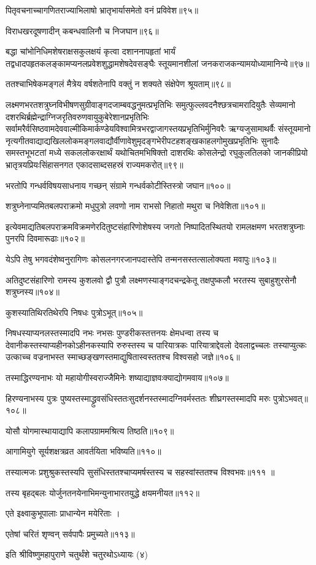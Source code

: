 पितृवचनाच्चागणितराज्याभिलाषो भ्रातृभार्यासमेतो वनं प्रविवेश॥९५॥

विराधखरदूषणादीन् कबन्धवालिनौ च निजघान॥९६॥

बद्धा चांभोनिधिमशेषराक्षसकुलक्षयं कृत्वा दशाननापहृतां भार्यं
तद्वधादपहृतकलङ्कामप्यनलप्रवेशशुद्धामशेषदेवसङ्घैः स्तूयमानशीलां जनकराजकन्यामयोध्यामानिन्ये॥९७॥

ततश्चाभिषेकमङ्गलं मैत्रेय वर्षशतेनापि वक्तुं न शक्यते संक्षेपेण श्रूयताम्॥९८॥

लक्ष्मणभरतशत्रुघ्नविभीषणसुग्रीवाङ्गदजाम्बवद्धनुमत्प्रभृतिभिः समुत्फुल्लवदनैश्छत्रचामरादियुतैः
सेव्यमानो दशरथिर्ब्रह्मेन्द्राग्निजरृतिवरुणवायुकुबेरेशानप्रभृतिभिः
सर्वामरैर्वसिष्ठवामदेववाल्मीकिमार्कण्डेयविश्वामित्रभरद्वाजागस्तयप्रभृतिभिर्मुनिवरैः
ऋग्यजुसामाथर्वैः संस्तूयमानो
नृत्यगीतवाद्याद्यखिललोकमङ्गलवाद्यौर्वीणावेशुमृदङ्गभेरीपटहशङ्खकाहलगोमुखप्रभृतिभिः सुनादैः
समस्तभूभटतां मध्ये सकललोकरक्षार्थं यथोचितमभिषिक्तो दाशरथिः कोसलेन्द्रो रघुकुलतिलको
जानकीप्रियो भ्रातृत्रयप्रियःसिंहासनगत एकादसाब्दसहस्रं राज्यमकरोत्॥९९॥

भरतोपि गन्धर्वविषयसाधनाय गच्छन् संग्रामे गन्धर्वकोटीस्तिस्त्रो जघान॥१००॥

शत्रुघ्नेनाप्यमितबलपराक्रमो मधुपुत्रो लवणो नाम राभसो निहातो मथुरा च निवेशिता॥१०१॥

इत्येवमाद्यतिबलपराक्रमविक्रमणेरदितुष्टसंहारिणोशेषस्य जगतो निष्पादितस्थितयो रामलक्षमण
भरतशत्रुघ्नाः पुनरपि दिवमारूढाः॥१०२॥

येऽपि तेषु भगवदंशेष्वनुरागिणः कोसलनगरजानपदास्तेपि तन्मनसस्तत्सालोक्यता मवापुः॥१०३॥

अतिदुष्टसंहारिणो रामस्य कुशलवो द्वौ पुत्रौ लक्ष्मणस्याङ्गदचन्द्रकेतू तक्षपुष्कलौ भरतस्य
सुबाहुशुरसेनौ शत्रुघ्नस्य॥१०४॥

कुशस्यातिथिरतिथेरपि निषधः पुत्रोऽभूत्॥१०५॥

निषधस्याप्यनलस्तस्मादपि नभः नभसः पुण्डरीकस्तत्तनयः क्षेमधन्वा तस्य च
देवानीकस्तस्याप्यहीनकोऽहीनकस्यापि रुरुस्तस्य च पारियात्रकः पारियात्राद्देवलो
देवलाद्वच्चलः तस्याप्युत्कः उत्काच्च वज्रनाभस्त स्माच्छङ्खणस्तमाद्युषितास्वस्ततश्च विश्वसहो
जज्ञे॥१०६॥

तस्माद्धिरण्यनाभः यो महायोगीस्वराज्जैमिनेः शष्याद्याज्ञवःक्याद्योगमवाय॥१०७॥

हिरण्यनाभस्य पुत्रः पुष्यस्तस्माद्ध्रुवसंधिस्ततःसुदर्शनस्तस्मादग्निवर्मस्ततः शीघ्रगस्तस्मादपि
मरुः पुत्रोऽभवत्॥१०८॥

योसौ योगमास्थायाद्यापि कलापग्राममश्रित्य तिष्ठति॥१०९॥

आगामियुगे सूर्यशक्षत्रव्रत आवर्तयिता भविष्यति॥११०॥

तस्यात्मजः प्रशुश्रुकस्तस्यपि सुसंधिस्ततश्चाप्यमर्षस्तस्य च सहस्वांस्ततश्च विश्वभवः॥१११
॥

तस्य बृहद्बलः योर्जुनतनयेनाभिमन्युनाभारतयुद्धे क्षयमनीयत॥११२॥

एते इक्ष्वाकुभूपालाः प्राधान्येन मयेरिताः ।

एतेषां चरितं शृण्वन् सर्वपापैः प्रमुच्यते॥११३॥

इति श्रीविष्णुमहापुराणे चतुर्थंशे चतुरथोऽध्यायः (४)
